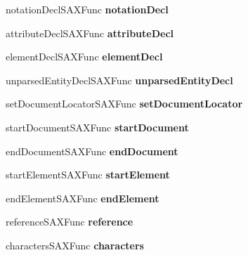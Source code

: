 \begin{DoxyCompactItemize}
notation\+Decl\+S\+A\+X\+Func {\bfseries notation\+Decl}
\item 
\mbox{\label{struct__xml_s_a_x_handler_a436a9f001d0955f31798d0e43c0ab8fd}} 
attribute\+Decl\+S\+A\+X\+Func {\bfseries attribute\+Decl}
\item 
\mbox{\label{struct__xml_s_a_x_handler_af860235c4e0b965047592ae2aae38ee0}} 
element\+Decl\+S\+A\+X\+Func {\bfseries element\+Decl}
\item 
\mbox{\label{struct__xml_s_a_x_handler_a16b83f8c8399c9e56bb2e11c2035ac66}} 
unparsed\+Entity\+Decl\+S\+A\+X\+Func {\bfseries unparsed\+Entity\+Decl}
\item 
\mbox{\label{struct__xml_s_a_x_handler_a23ec5a3c9a79c7d8dd8bc61a54da5cd4}} 
set\+Document\+Locator\+S\+A\+X\+Func {\bfseries set\+Document\+Locator}
\item 
\mbox{\label{struct__xml_s_a_x_handler_af62a85328a798558c2557f4f5ed11486}} 
start\+Document\+S\+A\+X\+Func {\bfseries start\+Document}
\item 
\mbox{\label{struct__xml_s_a_x_handler_aadfe2adaa6201eb2b2b4e7482140e52a}} 
end\+Document\+S\+A\+X\+Func {\bfseries end\+Document}
\item 
\mbox{\label{struct__xml_s_a_x_handler_ad2ced0dad0ea5ee43adb2ad1ab2de82c}} 
start\+Element\+S\+A\+X\+Func {\bfseries start\+Element}
\item 
\mbox{\label{struct__xml_s_a_x_handler_a9a2aa33cc91f4c84e7033d416a958901}} 
end\+Element\+S\+A\+X\+Func {\bfseries end\+Element}
\item 
\mbox{\label{struct__xml_s_a_x_handler_a4551a694ee274b38f04560cb318a50f8}} 
reference\+S\+A\+X\+Func {\bfseries reference}
\item 
\mbox{\label{struct__xml_s_a_x_handler_ae96001bf27ccc309489c8d43122bab97}} 
characters\+S\+A\+X\+Func {\bfseries characters}
\item 

\end{DoxyCompactItemize}
